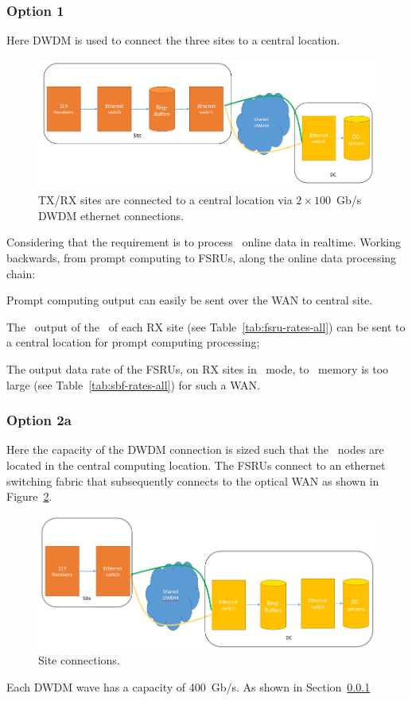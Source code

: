\documentclass[12pt,a4paper]{article}
\begin{document}
\subsubsection{Option 1}
Here DWDM is used to connect the three \ED sites to a central location.
\label{sssec:option1}
\begin{figure}[h]
\centering
\includegraphics[width=\textwidth]{photon_option_1.png}
\caption{\ED TX/RX sites are connected to a central location via $2\times 100 $~Gb/s DWDM ethernet connections.\label{fig:option_1}
}
\end{figure}
Considering that the requirement is to process \NBW\ online data in realtime.
Working backwards, from prompt computing to FSRUs, along the online data processing chain:
\bitm
\item Prompt computing output can easily be sent over the WAN to central site.
\item The \NBW\ output of the \SBF\ of each RX site (see Table~\ref{tab:fsru-rates-all}) can be sent to a central location for prompt computing processing;
\item The output data rate of the FSRUs, on RX sites in \NBW\ mode, to \RB\ memory is too large (see Table~\ref{tab:sbf-rates-all}) for such a WAN.
\eitm

\subsubsection{Option 2a}
\label{sssec:option2a}

Here the capacity of the DWDM connection is sized such that the \RB\ nodes are located in the central computing location.
The FSRUs connect to an ethernet switching fabric that subsequently connects to the optical WAN as shown in Figure~\ref{fig:option_2a}.
\begin{figure}[h]
\centering
\includegraphics[width=\textwidth]{photon_option_2a.png}
\caption{Site connections.\label{fig:option_2a}
}
\end{figure}
Each DWDM wave has a capacity of 400~Gb/s.
As shown in Section~\ref{}
\end{document}

